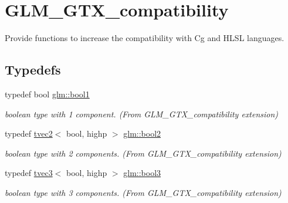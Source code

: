 \hypertarget{group__gtx__compatibility}{}\section{G\+L\+M\+\_\+\+G\+T\+X\+\_\+compatibility}
\label{group__gtx__compatibility}


Provide functions to increase the compatibility with Cg and H\+L\+SL languages.  


\subsection*{Typedefs}
\begin{DoxyCompactItemize}
\item 
\mbox{\label{group__gtx__compatibility_gab65f19f5170f95a2f06d6aa6482c9405}} 
typedef bool \hyperlink{group__gtx__compatibility_gab65f19f5170f95a2f06d6aa6482c9405}{glm\+::bool1}
\begin{DoxyCompactList}\small\item\em boolean type with 1 component. (From G\+L\+M\+\_\+\+G\+T\+X\+\_\+compatibility extension) \end{DoxyCompactList}\item 
\mbox{\label{group__gtx__compatibility_gabe088d78d539d2a98a2a04ab798fec1a}} 
typedef \hyperlink{structglm_1_1tvec2}{tvec2}$<$ bool, highp $>$ \hyperlink{group__gtx__compatibility_gabe088d78d539d2a98a2a04ab798fec1a}{glm\+::bool2}
\begin{DoxyCompactList}\small\item\em boolean type with 2 components. (From G\+L\+M\+\_\+\+G\+T\+X\+\_\+compatibility extension) \end{DoxyCompactList}\item 
\mbox{\label{group__gtx__compatibility_gab7658aa2e0688b8ac7e640cf7e405c1e}} 
typedef \hyperlink{structglm_1_1tvec3}{tvec3}$<$ bool, highp $>$ \hyperlink{group__gtx__compatibility_gab7658aa2e0688b8ac7e640cf7e405c1e}{glm\+::bool3}
\begin{DoxyCompactList}\small\item\em boolean type with 3 components. (From G\+L\+M\+\_\+\+G\+T\+X\+\_\+compatibility extension) \end{DoxyCompactList}\item 

\end{DoxyCompactItemize}
